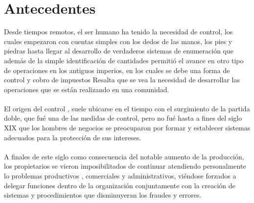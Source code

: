 \documentclass[12pt,letterpaper]{article}
\begin{document}
\section{Antecedentes}
Desde tiempos remotos, el ser humano ha tenido la necesidad de control, los cuales empezaron con cuentas simples con los dedos de las manos, los pies y piedras hasta llegar al desarrollo de verdaderos sistemas de enumeración que además de la simple identificación de cantidades permitió el avance en otro tipo de operaciones en los antiguos imperios, en los cuales se debe una forma de control y cobro de impuestos Resalta que se vea la necesidad de desarrollar las operaciones que se están realizando en una comunidad.\\${ }$\\
El origen del control , suele ubicarse en el tiempo con el surgimiento de la partida doble, que fué una de las medidas de control, pero no fué hasta a fines del siglo XIX que los hombres de negocios se preocuparon por formar y establecer sistemas adecuados para la protección de sus intereses.\\${ }$\\
A finales de este siglo como consecuencia del notable aumento de la producción, los propietarios se vieron imposibilitados de continuar atendiendo personalmente lo problemas productivos , comerciales y administrativos, viéndose forzados a delegar funciones dentro de la organización conjuntamente con la creación de sistemas y procedimientos que disminuyeran los fraudes y errores. 
\end{document}
